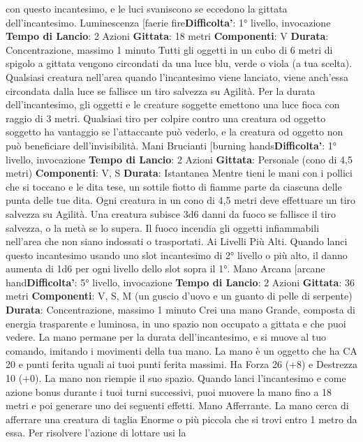 \begin{multicols}{2}
con questo incantesimo, e le luci svaniscono se
eccedono la gittata dell’incantesimo.
Luminescenza
[faerie fire\textbf{Difficolta'}:
1° livello, invocazione
\textbf{Tempo di Lancio}: 2 Azioni
\textbf{Gittata}: 18 metri
\textbf{Componenti}: V
\textbf{Durata}: Concentrazione, massimo 1 minuto
Tutti gli oggetti in un cubo di 6 metri di spigolo a gittata
vengono circondati da una luce blu, verde o viola (a tua
scelta). Qualsiasi creatura nell’area quando
l’incantesimo viene lanciato, viene anch’essa circondata
dalla luce se fallisce un tiro salvezza su Agilità. Per
la durata dell’incantesimo, gli oggetti e le creature
soggette emettono una luce fioca con raggio di 3 metri.
Qualsiasi tiro per colpire contro una creatura od oggetto
soggetto ha vantaggio se l’attaccante può vederlo, e la
creatura od oggetto non può beneficiare dell’invisibilità.
Mani Brucianti
[burning hands\textbf{Difficolta'}:
1° livello, invocazione
\textbf{Tempo di Lancio}: 2 Azioni
\textbf{Gittata}: Personale (cono di 4,5 metri)
\textbf{Componenti}: V, S
\textbf{Durata}: Istantanea
Mentre tieni le mani con i pollici che si toccano e le dita
tese, un sottile fiotto di fiamme parte da ciascuna delle
punta delle tue dita. Ogni creatura in un cono di 4,5
metri deve effettuare un tiro salvezza su Agilità.
Una creatura subisce 3d6 danni da fuoco se fallisce il
tiro salvezza, o la metà se lo supera.
Il fuoco incendia gli oggetti infiammabili nell’area che
non siano indossati o trasportati.
Ai Livelli Più Alti. Quando lanci questo incantesimo
usando uno slot incantesimo di 2° livello o più alto, il
danno aumenta di 1d6 per ogni livello dello slot sopra il
1°.
Mano Arcana
[arcane hand\textbf{Difficolta'}:
5° livello, invocazione
\textbf{Tempo di Lancio}: 2 Azioni
\textbf{Gittata}: 36 metri
\textbf{Componenti}: V, S, M (un guscio d’uovo e un guanto di
pelle di serpente)
\textbf{Durata}: Concentrazione, massimo 1 minuto
Crei una mano Grande, composta di energia
trasparente e luminosa, in uno spazio non occupato a
gittata e che puoi vedere. La mano permane per la
durata dell’incantesimo, e si muove al tuo comando,
imitando i movimenti della tua mano.
La mano è un oggetto che ha CA 20 e punti ferita uguali
ai tuoi punti ferita massimi. Ha Forza 26 (+8) e
Destrezza 10 (+0). La mano non riempie il suo spazio.
Quando lanci l’incantesimo e come azione bonus
durante i tuoi turni successivi, puoi muovere la mano
fino a 18 metri e poi generare uno dei seguenti effetti.
Mano Afferrante. La mano cerca di afferrare una
creatura di taglia Enorme o più piccola che si trovi entro 
1 metro da essa. Per risolvere l’azione di lottare usi la

\end{multicols}
